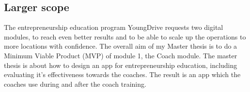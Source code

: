 \subsection{Larger scope}
The entrepreneurship education program YoungDrive requests two digital modules, to reach even better results and to be able to scale up the operations to more locations with confidence. The overall aim of my Master thesis is to do a Minimum Viable Product (MVP) of module 1, the Coach module. The master thesis is about how to design an app for entrepreneurship education, including evaluating it's effectiveness towards the coaches. The result is an app which the coaches use during and after the coach training.
